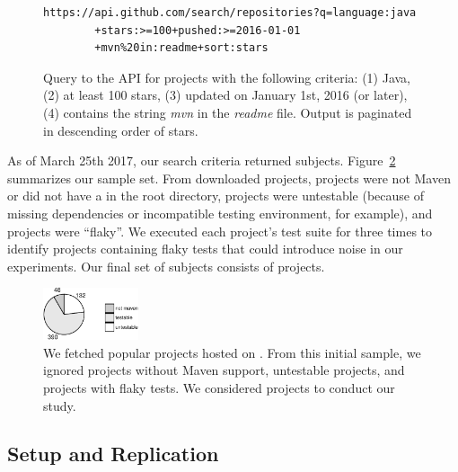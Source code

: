 \vspace{1ex}
\begin{figure}[h!]
\centering
\scriptsize
{}
\begin{lstlisting}
https://api.github.com/search/repositories?q=language:java
        +stars:>=100+pushed:>=2016-01-01
        +mvn%20in:readme+sort:stars
\end{lstlisting}
    \caption{\label{fig:subject-query} Query to the \github{} API for
    projects with the following criteria: (1) Java, (2) at least 100
    stars, (3) updated on January 1st, 2016 (or later), (4) contains
    the string \emph{mvn} in the \emph{readme} file. Output is
    paginated in descending order of stars.}
\end{figure}

As of March 25th 2017, our search criteria returned \SubjectsGithub{}
subjects. Figure~\ref{fig:subjects} summarizes our sample set. From
\SubjectsGithub{} downloaded projects, \SubjectsGithubNotMaven{}
projects were not Maven or did not have a \pomf{} in the root
directory, \SubjectsGithubNotTestable{} projects were untestable
(because of missing dependencies or incompatible testing environment,
for example), and \SubjectsGithubFlaky{} projects were ``flaky''.  We
executed each project's test suite for three times to identify
projects containing flaky tests that could introduce noise in our
experiments.  Our final set of subjects consists of \numSubjs{}
projects.

\begin{figure}[ht]
    \centering
    \includegraphics[width=0.25\textwidth]{plots/subjs.pdf}
    \caption{\label{fig:subjects}We fetched \SubjectsGithub{} popular
    projects hosted on \github{}. From this initial sample, we ignored
    \SubjectsGithubNotMaven{} projects without Maven support,
    \SubjectsGithubNotTestable{} untestable projects, and
    \SubjectsGithubFlaky{} projects with flaky tests. We considered
    \numSubjs{} projects to conduct our study.}
\end{figure}

\subsection{Setup and Replication}
\label{sec:setup}


